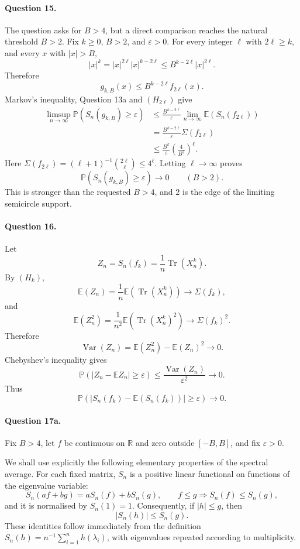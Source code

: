 \documentclass[11pt,a4paper]{article}
\newcommand{\R}{\mathbb{R}}
\newcommand{\E}{\mathbb{E}}
\newcommand{\Prob}{\mathbb{P}}
\DeclareMathOperator{\Tr}{Tr}
\begin{document}
\paragraph{Question 15.}
The question asks for $B>4$, but a direct comparison reaches the natural
threshold $B>2$.  Fix $k\ge0$, $B>2$, and $\varepsilon>0$.  For every
integer $\ell$ with $2\ell\ge k$, and every $x$ with $|x|>B$,
\[
  |x|^k=|x|^{2\ell}|x|^{k-2\ell}
  \le B^{k-2\ell}|x|^{2\ell}.
\]
Therefore
\[
  g_{k,B}(x)\le B^{k-2\ell}f_{2\ell}(x).
\]
Markov's inequality, Question 13a and $(H_{2\ell})$ give
\[
\begin{aligned}
\limsup_{n\to\infty}\Prob(S_n(g_{k,B})\ge\varepsilon)
&\le \frac{B^{k-2\ell}}{\varepsilon}
   \lim_{n\to\infty}\E(S_n(f_{2\ell}))\\
&=\frac{B^{k-2\ell}}{\varepsilon}\Sigma(f_{2\ell})\\
&\le \frac{B^k}{\varepsilon}\left(\frac4{B^2}\right)^\ell.
\end{aligned}
\]
Here $\Sigma(f_{2\ell})=(\ell+1)^{-1}\binom{2\ell}{\ell}\le4^\ell$.
Letting $\ell\to\infty$ proves
\[
  \boxed{\Prob(S_n(g_{k,B})\ge\varepsilon)\longrightarrow0
  \qquad(B>2).}
\]
This is stronger than the requested $B>4$, and $2$ is the edge of the
limiting semicircle support.

\paragraph{Question 16.}
Let
\[
  Z_n=S_n(f_k)=\frac1n\Tr(X_n^k).
\]
By $(H_k)$,
\[
  \E(Z_n)=\frac1n\E(\Tr(X_n^k))\longrightarrow\Sigma(f_k),
\]
and
\[
  \E(Z_n^2)=\frac1{n^2}\E(\Tr(X_n^k)^2)\longrightarrow\Sigma(f_k)^2.
\]
Therefore
\[
  \operatorname{Var}(Z_n)=\E(Z_n^2)-\E(Z_n)^2\longrightarrow0.
\]
Chebyshev's inequality gives
\[
  \Prob(|Z_n-\E Z_n|\ge\varepsilon)
  \le\frac{\operatorname{Var}(Z_n)}{\varepsilon^2}\longrightarrow0.
\]
Thus
\[
  \boxed{\Prob(|S_n(f_k)-\E(S_n(f_k))|\ge\varepsilon)\longrightarrow0.}
\]

\paragraph{Question 17a.}
Fix $B>4$, let $f$ be continuous on $\R$ and zero outside $[-B,B]$, and fix $\varepsilon>0$.

We shall use explicitly the following elementary properties of the spectral
average.  For each fixed matrix, $S_n$ is a positive linear functional on
functions of the eigenvalue variable:
\[
  S_n(af+bg)=aS_n(f)+bS_n(g),\qquad
  f\le g\Rightarrow S_n(f)\le S_n(g),
\]
and it is normalised by $S_n(1)=1$.  Consequently, if $|h|\le g$, then
\[
  |S_n(h)|\le S_n(g).
\]
These identities follow immediately from the definition
$S_n(h)=n^{-1}\sum_{i=1}^n h(\lambda_i)$, with eigenvalues repeated according
to multiplicity.
\end{document}
